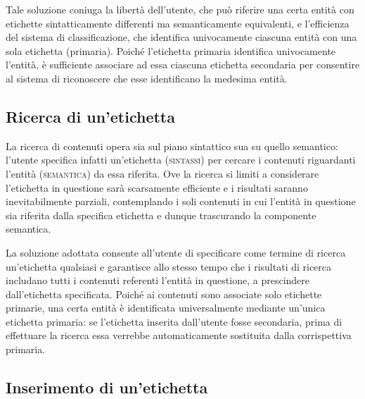 \documentclass[10pt,a4paper,headinclude,footinclude,hidelinks]{scrreprt} %
\begin{document}
	Tale soluzione coniuga la libertà dell'utente, che può riferire una certa entità con etichette sintatticamente differenti ma semanticamente equivalenti, e l'efficienza del sistema di classificazione, che identifica univocamente ciascuna entità con una sola etichetta (primaria). Poiché l'etichetta primaria identifica univocamente l'entità, è sufficiente associare ad essa ciascuna etichetta secondaria per consentire al sistema di riconoscere che esse identificano la medesima entità.

	\subsection{Ricerca di un'etichetta}
	La ricerca di contenuti opera sia sul piano sintattico sua su quello semantico: l'utente specifica infatti un'etichetta (\textsc{sintassi}) per cercare i contenuti riguardanti l'entità (\textsc{semantica}) da essa riferita. Ove la ricerca si limiti a considerare l'etichetta in questione sarà scarsamente efficiente e i risultati saranno inevitabilmente parziali, contemplando i soli contenuti in cui l'entità in questione sia riferita dalla specifica etichetta e dunque trascurando la componente semantica.
	
	La soluzione adottata consente all'utente di specificare come termine di ricerca un'etichetta qualsiasi e garantisce allo stesso tempo che i risultati di ricerca includano tutti i contenuti referenti l'entità in questione, a prescindere dall'etichetta specificata. Poiché ai contenuti sono associate solo etichette primarie, una certa entità è identificata universalmente mediante un'unica etichetta primaria: se l'etichetta inserita dall'utente fosse secondaria, prima di effettuare la ricerca essa verrebbe automaticamente sostituita dalla corrispettiva primaria.

	\subsection{Inserimento di un'etichetta}


\end{document}
